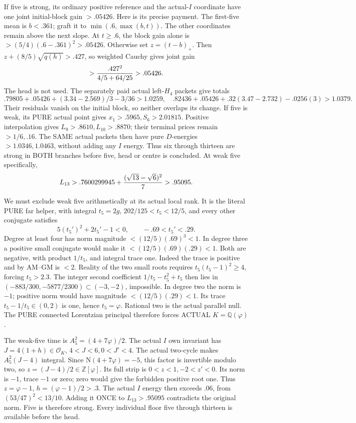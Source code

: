 If five is strong, its ordinary positive
reference and the actual-\(I\) coordinate
have one joint initial-block gain \(>.05426\).
Here is its precise payment.
The first-five mean is \(b<.361\);
graft it to \(\min(.6,\max(b,t))\).
The other coordinates remain above the
next slope.
At \(t\ge.6\), the block gain alone
is \(>(5/4)(.6-.361)^2>.05426\).
Otherwise set \(z=(t-b)_+\).
Then \(z+(8/5)\sqrt{q(h)}>.427\),
so weighted Cauchy gives joint gain
\[
                      >{.427^2\over4/5+64/25}>.05426 .
\]
The head is not used.
The separately paid actual left-\(H_4\)
packets give totals
\[
 .79805+.05426+(3.34-2.569)/3-3/36>1.0259,
 \quad
 .82436+.05426+.32(3.47-2.732)-.0256(3)>1.0379 .
\]
Their residuals vanish on the initial
block, so neither overlaps its change.
If five is weak, its PURE actual point
gives \(x_1>.5965,S_6>2.01815\).
Positive interpolation gives
\(L_9>.8610,L_{10}>.8870\);
their terminal prices remain \(>1/6,.16\).
The SAME actual packets then have pure
\(D\)-energies \(>1.0346,1.0463\),
without adding any \(I\) energy.
Thus six through thirteen are strong
in BOTH branches before five, head or
centre is concluded.
At weak five specifically,
\[
                 L_{13}>
 .7600299945+{(\sqrt{13}-\sqrt6)^2\over7}>.95095 .
\]

We must exclude weak five arithmetically
at its actual local rank.
It is the literal PURE far helper,
with integral \(t_5=2g\),
\(202/125<t_5<12/5\), and every other
conjugate satisfies
\[
                       5(t_5')^2+2t_5'-1<0,\qquad-.69<t_5'<.29 .
\]
Degree at least four has norm magnitude
\(<(12/5)(.69)^3<1\).
In degree three a positive small conjugate
would make it \(<(12/5)(.69)(.29)<1\).
Both are negative, with product
\(1/t_5\), and integral trace one.
Indeed the trace is positive and by
AM--GM is \(<2\).
Reality of the two small roots requires
\(t_5(t_5-1)^2\ge4\), forcing \(t_5>2.3\).
The integer second coefficient
\(1/t_5-t_5^2+t_5\) then lies in
\((-883/300,-5877/2300)\subset(-3,-2)\),
impossible.
In degree two the norm is \(-1\);
positive norm would have magnitude
\(<(12/5)(.29)<1\).
Its trace \(t_5-1/t_5\in(0,2)\)
is one, hence \(t_5=\varphi\).
Rational two is the actual parallel null.
The PURE connected Lorentzian principal
therefore forces ACTUAL \(K=\mathbb Q(\varphi)\).

The weak-five time is
\(A_5^2=(4+7\varphi)/2\).
The actual \(I\) own invariant has
\(J=4(1+h)\in\mathcal O_K\),
\(4<J<6,0<J'<4\).
The actual two-cycle makes
\(A_5^2(J-4)\) integral.
Since \(\mathrm N(4+7\varphi)=-5\),
this factor is invertible modulo two,
so \(z=(J-4)/2\in\mathbb Z[\varphi]\).
Its full strip is
\(0<z<1,-2<z'<0\).
Its norm is \(-1\), trace \(-1\)
or zero; zero would give the forbidden
positive root one.
Thus \(z=\varphi-1\),
\(h=(\varphi-1)/2>.3\).
The actual \(I\) energy then exceeds
\(.06\), from \((53/47)^2<13/10\).
Adding it ONCE to \(L_{13}>.95095\)
contradicts the original norm.
Five is therefore strong.
Every individual floor five through
thirteen is available before the head.

